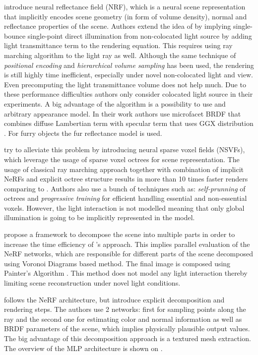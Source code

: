 \documentclass[english]{article}
\begin{document}
\cite{nrf2020} introduce neural reflectance field (NRF), which is a neural scene representation that implicitly encodes scene geometry (in form of volume density), normal and reflectance properties of the scene. Authors extend the idea of \cite{nerf2020mildenhall} by implying single-bounce single-point direct illumination from non-colocated light source by adding light transmittance term to the rendering equation. This requires using ray marching algorithm to the light ray as well. Although the same technique of \textit{positional encoding} and \textit{hierarchical volume sampling} has been used, the rendering is still highly time inefficient, especially under novel non-colocated light and view. Even precomputing the light transmittance volume does not help much. Due to these performance difficulties authors only consider colocated light source in their experiments. A big advantage of the algorithm is a possibility to use and arbitrary appearance model. In their work authors use microfacet BRDF that combines diffuse Lambertian term with specular term that uses GGX distribution \cite{walter2007microfacet}. For furry objects the fur reflectance model \cite{kajiya1989fur} is used.

\cite{nsvf2020} try to alleviate this problem by introducing neural sparse voxel fields (NSVFs), which leverage the usage of sparse voxel octrees for scene representation. The usage of classical ray marching approach together with combination of implicit NeRFs and explicit octree structure results in more than 10 times faster renders comparing to \cite{nerf2020mildenhall}. Authors also use a bunch of techniques such as: \textit{self-prunning} of octrees and \textit{progressive training} for efficient handling essential and non-essential voxels. However, the light interaction is not modelled meaning that only global illumination is going to be implicitly represented in the model.

\cite{rebain2020derf} propose a framework to decompose the scene into multiple parts in order to increase the time efficiency of \cite{nerf2020mildenhall}'s approach. This implies parallel evaluation of the NeRF networks, which are responsible for different parts of the scene decomposed using Voronoi Diagrams \cite{aurenhammer1991voronoi} based method. The final image is composed using Painter's Algorithm \cite{Newell1972ANA}. This method does not model any light interaction thereby limiting scene reconstruction under novel light conditions.

\cite{boss2020nerd} follows the NeRF architecture, but introduce explicit decomposition and rendering steps. The authors use 2 networks: first for sampling points along the ray and the second one for estimating color and normal information as well as BRDF parameters of the scene, which implies physically plausible output values. The big advantage of this decomposition approach is a textured mesh extraction. The overview of the MLP architecture is shown on .
\end{document}
